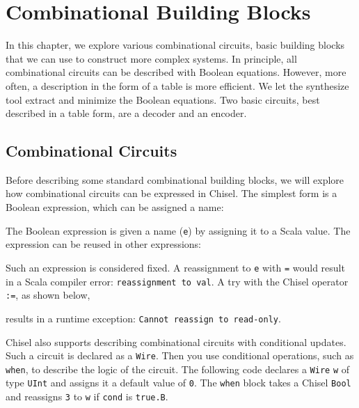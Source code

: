 \documentclass[%
    10pt,
    headinclude, footinclude=false,
    openright, %
    notitlepage,
    cleardoublepage=empty,
    headsepline,
    numbers=noenddot,
    bibliography=totoc, index=totoc,
    ]{scrbook}
\newcommand{\code}[1]{{\lstinline[basicstyle=\small\ttfamily]{#1}}}
\begin{document}
\chapter{Combinational Building Blocks}
\label{chap:comb}

In this chapter, we explore various combinational circuits, basic building blocks that we can
use to construct more complex systems.
In principle, all combinational circuits can be described with Boolean equations.
However, more often, a description in the form of a table is more efficient.
We let the synthesize tool extract and minimize the Boolean equations.
Two basic circuits, best described in a table form, are a decoder and an encoder.

\section{Combinational Circuits}


Before describing some standard combinational building blocks, we will explore
how combinational circuits can be expressed in Chisel.
The simplest form is a Boolean expression, which can be assigned a name:


\noindent The Boolean expression is given a name (\code{e}) by assigning it
to a Scala value. The expression can be reused in other expressions:


Such an expression is considered fixed. A reassignment to \code{e}
with \code{=} would result in a Scala compiler error: \code{reassignment to val}.
A try with the Chisel operator \code{:=}, as shown below,


\noindent results in a runtime exception: \code{Cannot reassign to read-only}.

Chisel also supports describing combinational circuits with conditional updates.
Such a circuit is declared as a \code{Wire}. Then you use conditional operations,
such as \code{when}, to describe the logic of the circuit.
The following code declares a \code{Wire} \code{w} of type \code{UInt} and assigns it a default
value of \code{0}. The \code{when} block takes a Chisel \code{Bool} and reassigns
\code{3} to \code{w} if \code{cond} is \code{true.B}.

\end{document}
